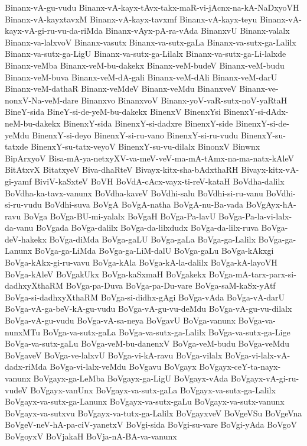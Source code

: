 {Binanx-vA-gu-vudu
Binanx-vA-kayx-tAvx-takx-maR-vi-jAcnx-na-kA-NaDxyoVH
Binanx-vA-kayxtavxM
Binanx-vA-kayx-tavxmf
Binanx-vA-kayx-teyu
Binanx-vA-kayx-vA-gi-ru-vu-da-riMda
Binanx-vAyx-pA-ra-vAda
BinanxvU
Binanx-valalx
Binanx-va-lalxvoV
Binanx-vasutx
Binanx-va-sutx-gaLa
Binanx-va-sutx-ga-Lalilx
Binanx-va-sutx-ga-LigU
Binanx-va-sutx-ga-Lilalx
Binanx-va-sutx-ga-Li-lalxde
Binanx-veMba
Binanx-veM-bu-dakekx
Binanx-veM-budeV
Binanx-veM-budu
Binanx-veM-buva
Binanx-veM-dA-gali
Binanx-veM-dAli
Binanx-veM-darU
Binanx-veM-dathaR
Binanx-veMdeV
Binanx-veMdu
BinanxveV
Binanx-ve-nonxV-Na-veM-dare
Binanxvo
BinanxvoV
Binanx-yoV-vaR-sutx-noV-yaRtaH
BineY-sida
BineY-si-de-yeM-bu-dakekx
BinenxV
BinenxYsi
BinenxY-si-dAdx-neM-bu-dakekx
BinenxY-sida
BinenxY-si-dadxre
BinenxY-side
BinenxY-si-de-yeMdu
BinenxY-si-deyo
BinenxY-si-ru-vano
BinenxY-si-ru-vudu
BinenxY-su-tatxde
BinenxY-su-tatx-veyoV
BinenxY-su-vu-dilalx
BinonxV
Binwnx
BipArxyoV
Bisa-mA-ya-netxyXV-va-meV-veV-ma-mA-tAmx-na-ma-natx-kAleV
BitAtxvX
BitatxyeV
Biva-dhaRteV
Bivayx-kitx-sha-bAdxthaRH
Bivayx-kitx-vA-gi-yamf
BiviV-kaSxteV
BoVH
BoVdA-cAcx-vayx-ti-reV-kataH
BoVdha-dalilx
BoVdha-ka-tavx-vanunx
BoVdha-kaveV
BoVdhi-salu
BoVdhi-si-ru-vanu
BoVdhi-si-ru-vudu
BoVdhi-suva
BoVgA
BoVgA-natha
BoVgA-nu-Ba-vada
BoVgAyx-hA-ravu
BoVga
BoVga-BU-mi-yalalx
BoVgaH
BoVga-Pa-lavU
BoVga-Pa-la-vi-lalx-da-vanu
BoVgada
BoVga-dalilx
BoVga-da-lilxdudx
BoVga-da-lilx-ruva
BoVga-deV-hakekx
BoVga-diMda
BoVga-gaLU
BoVga-gaLa
BoVga-ga-Lalilx
BoVga-ga-Lanunx
BoVga-ga-LiMda
BoVga-ga-LiM-dalU
BoVga-gaLu
BoVga-kAkxgi
BoVga-kAkx-gi-ru-vavu
BoVga-kAla
BoVga-kA-la-dalilx
BoVga-kA-layoVH
BoVga-kAleV
BoVgakUkx
BoVga-kaSxmaH
BoVgakekx
BoVga-mA-tarx-parx-si-dadhxyXthaRM
BoVga-pa-Duva
BoVga-pa-Du-vare
BoVga-saM-kaSx-yAtf
BoVga-si-dadhxyXthaRM
BoVga-si-didhx-gAgi
BoVga-vAda
BoVga-vA-darU
BoVga-vA-ga-beV-kA-gu-vudu
BoVga-vA-gu-vu-deMdu
BoVga-vA-gu-vu-dilalx
BoVga-vA-gu-vudu
BoVga-vA-sa-neya
BoVgavU
BoVga-vanunx
BoVga-va-nunxMTu
BoVga-va-sutx-gaLa
BoVga-va-sutx-ga-Lalilx
BoVga-va-sutx-ga-Lige
BoVga-va-sutx-gaLu
BoVga-veM-bu-danenxV
BoVga-veM-budu
BoVga-veMdu
BoVgaveV
BoVga-ve-lalxvU
BoVga-vi-kA-ravu
BoVga-vilalx
BoVga-vi-lalx-vA-dadx-riMda
BoVga-vi-lalx-veMdu
BoVgavu
BoVgayx
BoVgayx-ceY-ta-nayx-vanunx
BoVgayx-ga-LeMba
BoVgayx-ga-LigU
BoVgayx-vAda
BoVgayx-vA-gi-ru-vudeV
BoVgayx-vanUnx
BoVgayx-va-sutx-gaLa
BoVgayx-va-sutx-ga-Lalilx
BoVgayx-va-sutx-ga-Lanunx
BoVgayx-va-sutx-gaLu
BoVgayx-va-sutx-vanunx
BoVgayx-va-sutxvu
BoVgayx-va-tutx-ga-Lalilx
BoVgayxveV
BoVgeVSu
BoVgeVna
BoVgeV-neV-hA-pa-ciV-yanetxV
BoVgi-sida
BoVgi-su-vare
BoVgi-yAda
BoVgoV
BoVgoyxV
BoVjakaH
BoVja-nA-BA-va-vanunx
}
